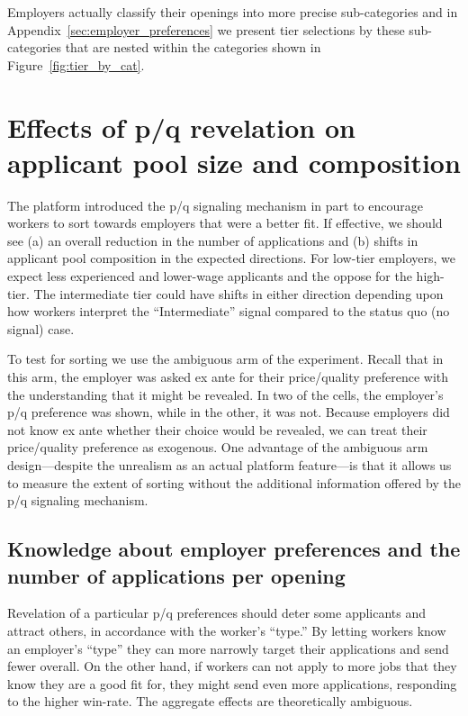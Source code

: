 \documentclass[prodmode,acmec]{ec-acmsmall}
\begin{document}
Employers actually classify their openings into more precise sub-categories and in Appendix~\ref{sec:employer_preferences} we present tier selections by these sub-categories that are nested within the categories shown in Figure~\ref{fig:tier_by_cat}. 

\section{Effects of p/q revelation on applicant pool size and composition} \label{sec:composition}
The platform introduced the p/q signaling mechanism in part to encourage workers to sort towards employers that were a better fit.
If effective, we should see (a) an overall reduction in the number of applications and (b) shifts in applicant pool composition in the expected directions.
For low-tier employers, we expect less experienced and lower-wage applicants and the oppose for the high-tier.
The intermediate tier could have shifts in either direction depending upon how workers interpret the ``Intermediate'' signal compared to the status quo (no signal) case. 

To test for sorting we use the ambiguous arm of the experiment. 
Recall that in this arm, the employer was asked ex ante for their price/quality preference with the understanding that it might be revealed. 
In two of the cells, the employer's p/q preference was shown, while in the other, it was not. 
Because employers did not know ex ante whether their choice would be revealed, we can treat their price/quality preference as exogenous.
One advantage of the ambiguous arm design---despite the unrealism as an actual platform feature---is that it allows us to measure the extent of sorting without the additional information offered by the p/q signaling mechanism. 

\subsection{Knowledge about employer preferences and the number of applications per opening} 
Revelation of a particular p/q preferences should deter some applicants and attract others, in accordance with the worker's ``type.'' 
By letting workers know an employer's ``type'' they can more narrowly target their applications and send fewer overall.
On the other hand, if workers can not apply to more jobs that they know they are a good fit for, they might send even more applications, responding to the higher win-rate.
The aggregate effects are theoretically ambiguous. 
\end{document}
